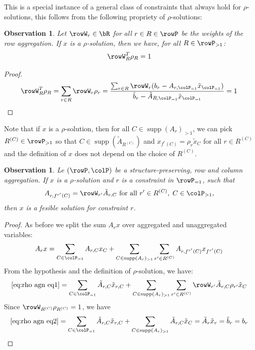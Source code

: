 \documentclass[smallextended,natbib]{svjour3}       %
\newtheorem{observation}[theorem]{Observation}
\DeclareMathOperator{\supp}{supp}
\numberwithin{definition}{section}
\numberwithin{theorem}{section}
\numberwithin{proposition}{section}
\begin{document}
This is a special instance of a general class of constraints that always hold for \(\rho\)-solutions, this follows from the following propriety of \(\rho\)-solutions:

\begin{observation}
  \label{ob:rhoconvex}
  Let \(\rowW_r \in \bR\) for all \(r \in R \in \rowP\) be the weights of the row aggregation.
  If \(x\) is a \(\rho\)-solution, then we have, for all \(R \in \rowP_{>1}\):
  \begin{equation}
    \rowW_R^T \rho_R = 1
  \end{equation}
\end{observation}
\begin{proof}
  \[
  \rowW_R^T \rho_R = \sum_{r \in R} \rowW_r \rho_r =  \frac{\sum_{r \in R}\rowW_r(b_r - A_{r, \colP_{=1}} \tilde{x}_{\colP_{=1}})}{\tilde{b}_r
  - \tilde{A}_{R, \colP_{=1}} \tilde{x}_{\colP_{=1}}} = 1
  \] 
\end{proof}
Note that if \(x\) is a \(\rho\)-solution, then for all \(C \in \supp(A_{r})_{>1}\), we can pick \(R^{(C)} \in \rowP_{>1}\) so that \(C \in \supp(\tilde{A}_{R^{(C)}})\) and \(x_{f^r(C)} = \rho_r \tilde{x}_C\) for all \(r \in R^{(C)}\) and the definition of \(x\) does not depend on the choice of \(R^{(C)}\).
\begin{observation}
  Le \((\rowP,\colP)\) be a structure-preserving, row and column aggregation. If \(x\) is a \(\rho\)-solution and \(r\) is a constraint in \(\rowP_{=1}\), such that 
  \[A_{r,f^{r'}(C)} = \rowW_{r'}\tilde{A}_{r,C} \text{ for all } r' \in R^{(C)},\; C \in \colP_{>1}, \]
  then \(x\) is a fesible solution for constraint \(r\).
\end{observation}

\begin{proof}
As before we split the sum \(A_rx\) over aggregated and unaggregated variables:
\begin{equation}
  \label{eq:rho agn eq1}
  A_rx = \sum_{C \in \colP_{=1}}A_{r,C}x_{C} +  \sum_{C \in \supp(A_{r})_{>1}} \sum_{r' \in R^{(C)}} A_{r,f^{r'}(C)}x_{f^{r'}(C)}
\end{equation}
From the hypothesis and the definition of \(\rho\)-solution, we have:
\begin{equation}
  \label{eq:rho agn eq2}
    \eqref{eq:rho agn eq1} =  \sum_{C \in \colP_{=1}}\tilde{A}_{r,C}\tilde{x}_{r,C} +  \sum_{C \in \supp(A_{r})_{>1}} \sum_{r' \in R^{(C)}}\rowW_{r'} \tilde{A}_{r,C}\rho_{r'}\tilde{x}_{C} 
\end{equation}
Since \(\rowW_{R^{(C)}} \rho_{R^{(C)}} = 1\), we have
\begin{equation}
  \label{eq:rho agn eq3}
    \eqref{eq:rho agn eq2} =   \sum_{C \in \colP_{=1}}\tilde{A}_{r,C}\tilde{x}_{r,C} +  \sum_{C \in \supp(A_{r})_{>1}}\tilde{A}_{r,C}\tilde{x}_{C} = \tilde{A}_r\tilde{x}_r = \tilde{b}_r = b_r
\end{equation}
\end{proof}
\end{document}
